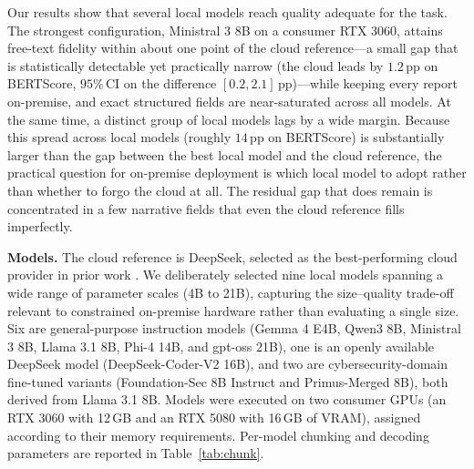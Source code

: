 
Our results show that several local models reach quality adequate for the task. The strongest configuration, Ministral 3 8B on a consumer RTX 3060, attains free-text fidelity within about one point of the cloud reference---a small gap that is statistically detectable yet practically narrow (the cloud leads by $1.2$\,pp on BERTScore, $95\%$\,CI on the difference $[0.2, 2.1]$\,pp)---while keeping every report on-premise, and exact structured fields are near-saturated across all models. At the same time, a distinct group of local models lags by a wide margin. Because this spread across local models (roughly $14$\,pp on BERTScore) is substantially larger than the gap between the best local model and the cloud reference, the practical question for on-premise deployment is which local model to adopt rather than whether to forgo the cloud at all. The residual gap that does remain is concentrated in a few narrative fields that even the cloud reference fills imperfectly.

\textbf{Models.} The cloud reference is DeepSeek, selected as the best-performing cloud provider in prior work \cite{anonpipeline2026}. We deliberately selected nine local models spanning a wide range of parameter scales (4B to 21B), capturing the size--quality trade-off relevant to constrained on-premise hardware rather than evaluating a single size. Six are general-purpose instruction models (Gemma 4 E4B, Qwen3 8B, Ministral 3 8B, Llama 3.1 8B, Phi-4 14B, and gpt-oss 21B), one is an openly available DeepSeek model (DeepSeek-Coder-V2 16B), and two are cybersecurity-domain fine-tuned variants (Foundation-Sec 8B Instruct and Primus-Merged 8B), both derived from Llama 3.1 8B. Models were executed on two consumer GPUs (an RTX 3060 with 12\,GB and an RTX 5080 with 16\,GB of VRAM), assigned according to their memory requirements. Per-model chunking and decoding parameters are reported in Table~\ref{tab:chunk}.

